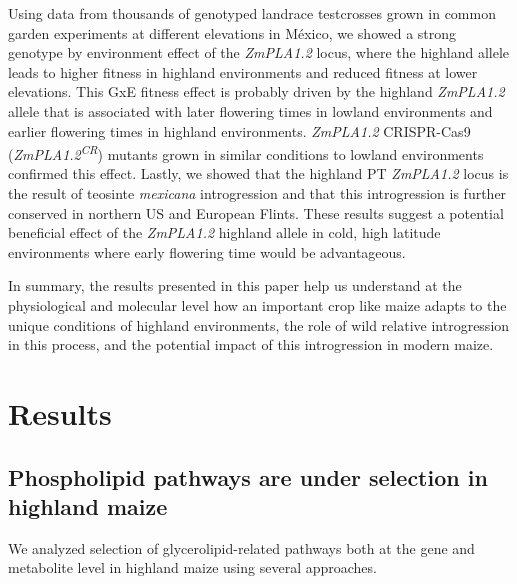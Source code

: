 \documentclass[9pt,twocolumn,twoside,lineno]{BioRxiv}
\begin{document}
Using data from thousands of genotyped landrace testcrosses grown in common garden experiments at different elevations in México, we showed a strong genotype by environment effect of the \textit{ZmPLA1.2} locus, 
where the highland allele leads to higher fitness in highland environments and reduced fitness at lower elevations. 
This GxE fitness effect is probably driven by the highland \textit{ZmPLA1.2} allele that is associated with later flowering times in lowland environments and earlier flowering times in highland environments. 
\textit{ZmPLA1.2} CRISPR-Cas9 (\textit{ZmPLA1.2\textsuperscript{CR}}) mutants grown in similar conditions to lowland environments confirmed this effect.
Lastly, we showed that the highland PT \textit{ZmPLA1.2} locus is the result of teosinte \textit{mexicana} introgression and that this introgression is further conserved in northern US and European Flints. 
These results suggest a potential beneficial effect of the \textit{ZmPLA1.2} highland allele in cold, high latitude environments where early flowering time would be advantageous.

In summary, the results presented in this paper help us understand at the physiological and molecular level how an important crop like maize adapts to the unique conditions of highland environments, the role of wild relative introgression in this process, and the potential impact of this introgression in modern maize.

\section{Results}
\label{sec:results}

\subsection{Phospholipid pathways are under selection in  highland maize} 
We analyzed selection of glycerolipid-related pathways both at the gene and metabolite level in highland maize using several approaches.
\end{document}
